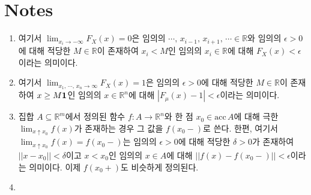 \section*{Notes}
\footnotesize
\begin{enumerate}[label = \textsf{\textbf{\arabic*}}]
    \item 여기서 $\lim_{x_i\to-\infty}F_X(x)=0$은 임의의 $\cdots,\,x_{i-1},\,x_{i+1},\,\cdots\in\mathbb{R}$와 임의의 $\epsilon>0$에 대해 적당한 $M\in\mathbb{R}$이 존재하여 $x_i<M$인 임의의 $x_i\in\mathbb{R}$에 대해 $F_X(x)<\epsilon$이라는 의미이다.
    \item 여기서 $\lim_{x_1,\,\cdots,\,x_n\to\infty}F_X(x)=1$은 임의의 $\epsilon>0$에 대해 적당한 $M\in\mathbb{R}$이 존재하여 $x\geq M\mathbf{1}$인 임의의 $x\in\mathbb{R}^n$에 대해 $|F_\mu(x)-1|<\epsilon$이라는 의미이다.
    \item 집합 $A\subseteq\mathbb{R}^m$에서 정의된 함수 $f:A\to\mathbb{R}^n$와 한 점 $x_0\in\mathrm{acc}\,A$에 대해 극한 $\lim_{x\uparrow x_0}f(x)$가 존재하는 경우 그 값을 $f(x_0-)$로 쓴다. 한편, 여기서 $\lim_{x\uparrow x_0}f(x)=f(x_0-)$는 임의의 $\epsilon>0$에 대해 적당한 $\delta>0$가 존재하여 $||x-x_0||<\delta$이고 $x<x_0$인 임의의 $x\in A$에 대해 $||f(x)-f(x_0-)||<\epsilon$이라는 의미이다. 이제 $f(x_0+)$도 비슷하게 정의된다.
    \item 
\end{enumerate}